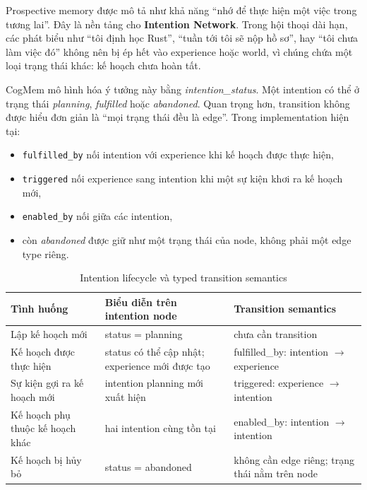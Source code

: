 \documentclass[../main.tex]{subfiles}
\begin{document}
Prospective memory được mô tả như khả năng ``nhớ để thực hiện một việc trong tương lai''. Đây là nền tảng cho \textbf{Intention Network}. Trong hội thoại dài hạn, các phát biểu như ``tôi định học Rust'', ``tuần tới tôi sẽ nộp hồ sơ'', hay ``tôi chưa làm việc đó'' không nên bị ép hết vào experience hoặc world, vì chúng chứa một loại trạng thái khác: kế hoạch chưa hoàn tất.

CogMem mô hình hóa ý tưởng này bằng \textit{intention\_status}. Một intention có thể ở trạng thái \textit{planning}, \textit{fulfilled} hoặc \textit{abandoned}. Quan trọng hơn, transition không được hiểu đơn giản là ``mọi trạng thái đều là edge''. Trong implementation hiện tại:
\begin{itemize}
    \item \texttt{fulfilled\_by} nối intention với experience khi kế hoạch được thực hiện,
    \item \texttt{triggered} nối experience sang intention khi một sự kiện khơi ra kế hoạch mới,
    \item \texttt{enabled\_by} nối giữa các intention,
    \item còn \textit{abandoned} được giữ như một trạng thái của node, không phải một edge type riêng.
\end{itemize}

\begin{table}[H]
\centering
\caption{Intention lifecycle và typed transition semantics}
\label{tab:intention_lifecycle}
\begin{tabularx}{\linewidth}{@{}YYY@{}}
\toprule
\textbf{Tình huống} & \textbf{Biểu diễn trên intention node} & \textbf{Transition semantics} \\
\midrule
Lập kế hoạch mới & status = planning & chưa cần transition \\
Kế hoạch được thực hiện & status có thể cập nhật; experience mới được tạo & fulfilled\_by: intention $\rightarrow$ experience \\
Sự kiện gợi ra kế hoạch mới & intention planning mới xuất hiện & triggered: experience $\rightarrow$ intention \\
Kế hoạch phụ thuộc kế hoạch khác & hai intention cùng tồn tại & enabled\_by: intention $\rightarrow$ intention \\
Kế hoạch bị hủy bỏ & status = abandoned & không cần edge riêng; trạng thái nằm trên node \\
\bottomrule
\end{tabularx}
\end{table}
\end{document}
